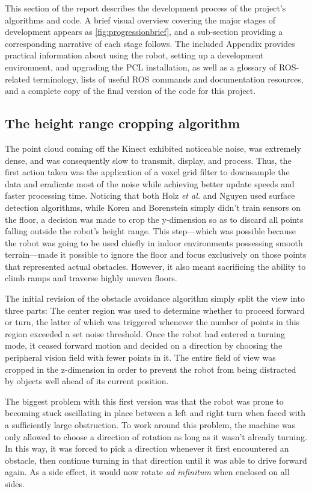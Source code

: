 \documentclass[12pt]{report}
\begin{document}
This section of the report describes the development process of the project's algorithms and code.  A brief visual overview covering the major stages of development appears as \autoref{fig:progressionbrief}, and a sub-section providing a corresponding narrative of each stage follows.  The included Appendix provides practical information about using the robot, setting up a development environment, and upgrading the PCL installation, as well as a glossary of ROS-related terminology, lists of useful ROS commands and documentation resources, and a complete copy of the final version of the code for this project.

\subsection[Height range cropping]{The height range cropping algorithm}
The point cloud coming off the Kinect exhibited noticeable noise, was extremely dense, and was consequently slow to transmit, display, and process.  Thus, the first action taken was the application of a voxel grid filter to downsample the data and eradicate most of the noise while achieving better update speeds and faster processing time.  Noticing that both Holz \textit{et al.} and Nguyen used surface detection algorithms, while Koren and Borenstein simply didn't train sensors on the floor, a decision was made to crop the y-dimension so as to discard all points falling outside the robot's height range.  This step---which was possible because the robot was going to be used chiefly in indoor environments possessing smooth terrain---made it possible to ignore the floor and focus exclusively on those points that represented actual obstacles.  However, it also meant sacrificing the ability to climb ramps and traverse highly uneven floors.

The initial revision of the obstacle avoidance algorithm simply split the view into three parts:  The center region was used to determine whether to proceed forward or turn, the latter of which was triggered whenever the number of points in this region exceeded a set noise threshold.  Once the robot had entered a turning mode, it ceased forward motion and decided on a direction by choosing the peripheral vision field with fewer points in it.  The entire field of view was cropped in the z-dimension in order to prevent the robot from being distracted by objects well ahead of its current position.

The biggest problem with this first version was that the robot was prone to becoming stuck oscillating in place between a left and right turn when faced with a sufficiently large obstruction.  To work around this problem, the machine was only allowed to choose a direction of rotation as long as it wasn't already turning.  In this way, it was forced to pick a direction whenever it first encountered an obstacle, then continue turning in that direction until it was able to drive forward again.  As a side effect, it would now rotate \textit{ad infinitum} when enclosed on all sides.
\end{document}
